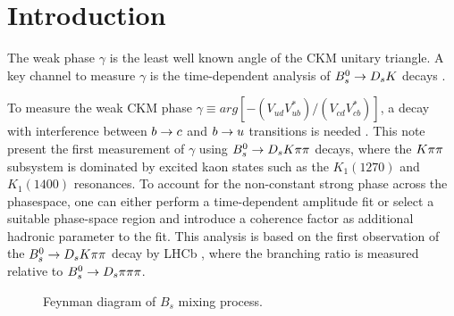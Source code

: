 
\section{Introduction}
\label{sec:Introduction}

The weak phase $\gamma$ is the least well known angle of the CKM unitary triangle. 
A key channel to measure $\gamma$ is the time-dependent analysis of ${{B}^0_{s}}\rightarrow{\ensuremath{{D}_{s}}}{\ensuremath{K}}$ decays \cite{Fleischer:2003yb,DeBruyn:2012jp}. 

To measure the weak CKM phase $\gamma \equiv arg[-(V_{ud}V_{ub}^{*})/(V_{cd}V_{cb}^{*})]$, a decay with interference between ${b}\rightarrow{\ensuremath{c}}$ and ${b}\rightarrow{\ensuremath{u}}$ transitions is needed \cite{Fleischer:2003yb}.
This note present the first measurement of $\gamma$ using ${{B}^0_{s}}\rightarrow{\ensuremath{{D}_{s}}}{\ensuremath{K}}\pi\pi$ decays, where the ${K}{\pi}{\pi}$ subsystem 
is dominated by excited kaon states such as the $K_{1}(1270)$ and $K_{1}(1400)$ resonances.
To account for the non-constant strong phase across the phasespace, 
one can either perform a time-dependent amplitude fit 
or select a suitable phase-space region and introduce a coherence factor as additional hadronic parameter to the fit.
This analysis is based on the first observation of the ${{B}^0_{s}}\rightarrow{\ensuremath{{D}_{s}}}{\ensuremath{K}}{\ensuremath{\pi}}{\ensuremath{\pi}}$ decay by LHCb \cite{Blusk:1471393,Blusk:2012it}, where the branching ratio is measured relative to ${{B}^0_{s}}\rightarrow{\ensuremath{{D}_{s}}}{\ensuremath{\pi}}{\ensuremath{\pi}}{\ensuremath{\pi}}$.


\begin{figure}[h]
\centering
{}
\caption{Feynman diagram of $B_s$ mixing process.}
\label{fig:mixing_feynman}
\end{figure}


